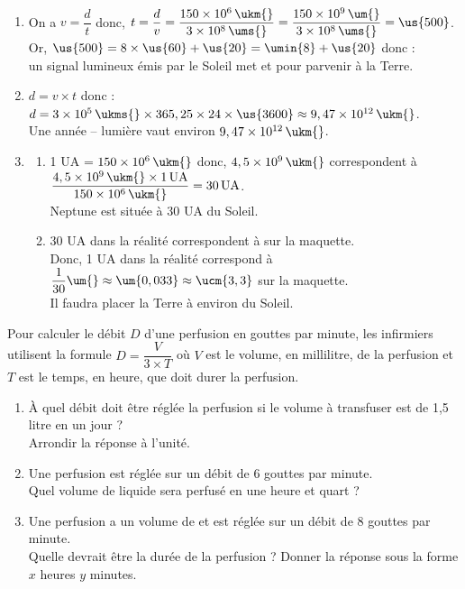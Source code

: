 \begin{corrige}
\ \\ [-5.5mm]
   \begin{enumerate}
      \item On a $v =\dfrac{d}{t}$ donc, $t =\dfrac{d}{v} =\dfrac{150\times10^6\,\ukm{}}{3\times10^8\,\ums{}} =\dfrac{150\times10^9\,\um{}}{3\times10^8\,\ums{}} =\us{500}$. \\ [1mm]
         Or, $\us{500} =8\times\us{60}+\us{20} =\umin{8}+\us{20}$ donc : \\
         {\blue un signal lumineux émis par le Soleil met  et  pour parvenir à la Terre}.
      \item $d =v\times t$ donc : $d =3\times10^5\,\ukms{}\times365,25\times24\times\us{3600} \approx9,47\times10^{12}\,\ukm{}$. \\
         {\blue Une année -- lumière vaut environ $9,47\times10^{12}\,\ukm{}$.}
      \item
         \begin{enumerate}
            \item 1 UA = $150\times10^6\,\ukm{}$ donc, $4,5\times10^9\,\ukm{}$ correspondent à $\dfrac{4,5\times10^9\,\ukm{}\times1\,\text{UA}}{150\times10^6\,\ukm{}} =30\,\text{UA}$. \\ [1mm]
               {\blue Neptune est située à 30 UA du Soleil.}
            \item 30 UA dans la réalité correspondent à  sur la maquette. \\
               Donc, 1 UA dans la réalité correspond à $\dfrac{1}{30}\um{} \approx\um{0,033} \approx\ucm{3,3}$ sur la maquette. \\ [1mm]
               {\blue Il faudra placer la Terre à environ  du Soleil.}
         \end{enumerate}
   \end{enumerate}
\end{corrige}

\bigskip


\begin{exercice}[CRPE 2017 G3] %
   Pour calculer le débit $D$ d’une perfusion en gouttes par minute, les infirmiers utilisent la formule $D =\dfrac{V}{3\times T}$ où $V$ est le volume, en millilitre, de la perfusion et $T$ est le temps, en heure, que doit durer la perfusion.
   \begin{enumerate}
      \item À quel débit doit être réglée la perfusion si le volume à transfuser est de 1,5 litre en un jour ? \\
         Arrondir la réponse à l’unité.
      \item Une perfusion est réglée sur un débit de 6 gouttes par minute. \\
         Quel volume de liquide sera perfusé en une heure et quart ?
      \item Une perfusion a un volume de  et est réglée sur un débit de 8 gouttes par minute. \\
         Quelle devrait être la durée de la perfusion ? Donner la réponse sous la forme $x$ heures $y$ minutes.
   \end{enumerate}
\end{exercice}

